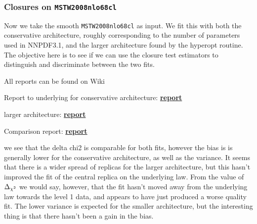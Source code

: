 \subsubsection*{Closures on \texttt{MSTW2008nlo68cl}}

Now we take the smooth \texttt{MSTW2008nlo68cl} as input. We fit this
with both the conservative architecture, roughly corresponding to the number of
parameters used in NNPDF3.1, and the larger architecture found by the hyperopt
routine. The objective here is to see if we can use the closure test estimators
to distinguish and discriminate between the two fits.

All reports can be found on Wiki

Report to underlying for conservative architecture:
\href{https://vp.nnpdf.science/9qr4qCK2RHePHehBpgxBdQ==/}{\bf{report}}

larger architecture:
\href{https://vp.nnpdf.science/pdm9Y1fjTw21nhlzjzErjw==/}{\bf{report}}

Comparison report:
\href{https://vp.nnpdf.science/lQjtB-lnRy263IhAYCTw1Q==/}{\bf{report}}

we see that the delta chi2 is comparable for both fits, however the bias is
is generally lower for the conservative architecture, as well as the variance.
It seems that there is a wider spread of replicas for the larger architecture,
but this hasn't improved the fit of the central replica on the underlying law.
From the value of $\Delta_{\chi^{2}}$ we would say, however, that the fit hasn't moved away
from the underlying law towards the level 1 data, and appears to have just
produced a worse quality fit. The lower variance is expected for the smaller
architecture, but the interesting thing is that there hasn't been a gain in
the bias.
